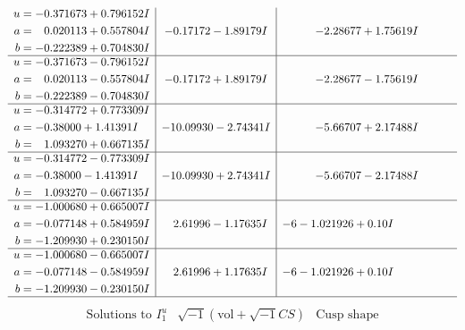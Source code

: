 \documentclass[1p]{elsarticle_modified}
\theoremstyle{definition}
\newcommand{\I}{\sqrt{-1}}
\begin{document}
$$\begin{array}{c|c|c}
\begin{aligned}
u &= -0.371673 + 0.796152 I \\
a &= \phantom{-}0.020113 + 0.557804 I \\
b &= -0.222389 + 0.704830 I\end{aligned}
 & -0.17172 - 1.89179 I & -2.28677 + 1.75619 I \\ \hline\begin{aligned}
u &= -0.371673 - 0.796152 I \\
a &= \phantom{-}0.020113 - 0.557804 I \\
b &= -0.222389 - 0.704830 I\end{aligned}
 & -0.17172 + 1.89179 I & -2.28677 - 1.75619 I \\ \hline\begin{aligned}
u &= -0.314772 + 0.773309 I \\
a &= -0.38000 + 1.41391 I \\
b &= \phantom{-}1.093270 + 0.667135 I\end{aligned}
 & -10.09930 - 2.74341 I & -5.66707 + 2.17488 I \\ \hline\begin{aligned}
u &= -0.314772 - 0.773309 I \\
a &= -0.38000 - 1.41391 I \\
b &= \phantom{-}1.093270 - 0.667135 I\end{aligned}
 & -10.09930 + 2.74341 I & -5.66707 - 2.17488 I \\ \hline\begin{aligned}
u &= -1.000680 + 0.665007 I \\
a &= -0.077148 + 0.584959 I \\
b &= -1.209930 + 0.230150 I\end{aligned}
 & \phantom{-}2.61996 - 1.17635 I &                  -6
-1.021926 + 0. 10   I\phantom{ +0.000000I} \\ \hline\begin{aligned}
u &= -1.000680 - 0.665007 I \\
a &= -0.077148 - 0.584959 I \\
b &= -1.209930 - 0.230150 I\end{aligned}
 & \phantom{-}2.61996 + 1.17635 I &                  -6
-1.021926 + 0. 10   I\phantom{ +0.000000I}\\
 \hline 
 \end{array}$$\newpage$$\begin{array}{c|c|c}  
\text{Solutions to }I^u_{1}& \I (\text{vol} + \sqrt{-1}CS) & \text{Cusp shape}\\
 \hline 
\begin{aligned}

\end{aligned}
\end{array}$$
\end{document}
